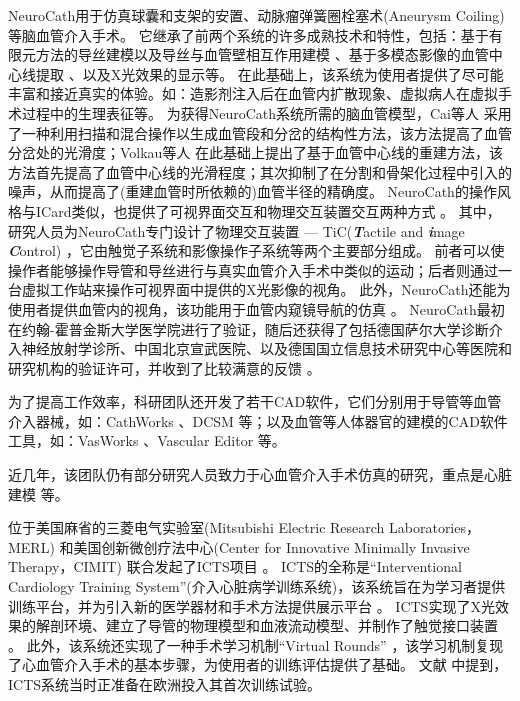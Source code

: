 NeuroCath用于仿真球囊和支架的安置、动脉瘤弹簧圈栓塞术(Aneurysm Coiling)等脑血管介入手术。
它继承了前两个系统的许多成熟技术和特性，包括：基于有限元方法的导丝建模以及导丝与血管壁相互作用建模 \cite{Wang1996daVinci,Chui1996daVinci}、基于多模态影像的血管中心线提取 \cite{Wang1998ICard}、以及X光效果的显示\cite{Wang1998aICard,Wang1998ICard}等。%
在此基础上，该系统为使用者提供了尽可能丰富和接近真实的体验。如：造影剂注入后在血管内扩散现象、虚拟病人在虚拟手术过程中的生理表征等。
为获得NeuroCath系统所需的脑血管模型，Cai等人 \cite{Ye2002Vessel,Cai2003aVessel,Cai2003Vessel}采用了一种利用扫描和混合操作以生成血管段和分岔的结构性方法，该方法提高了血管分岔处的光滑度；Volkau等人 \cite{Volkau2005Vessel,Volkau2008Vessel}在此基础上提出了基于血管中心线的重建方法，该方法首先提高了血管中心线的光滑程度；其次抑制了在分割和骨架化过程中引入的噪声，从而提高了(重建血管时所依赖的)血管半径的精确度。%
NeuroCath的操作风格与ICard类似，也提供了可视界面交互和物理交互装置交互两种方式 \cite{Nowinski2001NeuroCath}。
其中，研究人员为NeuroCath专门设计了物理交互装置 --- TiC(\textbf{\textit{T}}actile and \textbf{\textit{i}}mage \textbf{\textit{C}}ontrol)\cite{Chui1999TiC} \cite{Ma1999TiC}，它由触觉子系统和影像操作子系统等两个主要部分组成。%
前者可以使操作者能够操作导管和导丝进行与真实血管介入手术中类似的运动；后者则通过一台虚拟工作站来操作可视界面中提供的X光影像的视角。
此外，NeuroCath还能为使用者提供血管内的视角，该功能用于血管内窥镜导航的仿真 \cite{Nowinski2001NeuroCath}。
NeuroCath最初在约翰-霍普金斯大学医学院进行了验证，随后还获得了包括德国萨尔大学诊断介入神经放射学诊所、中国北京宣武医院、以及德国国立信息技术研究中心等医院和研究机构的验证许可，并收到了比较满意的反馈 \cite{Ma2007NeuroCath}。%

为了提高工作效率，科研团队还开发了若干CAD软件，它们分别用于导管等血管介入器械，如：CathWorks \cite{Cai1998CathWorks,Cai2000CathWorks}、DCSM \cite{Li2001DCSM}等；以及血管等人体器官的建模的CAD软件工具，如：VasWorks \cite{Cai2003Vessel}、Vascular Editor \cite{Ma2007NeuroCath}等。%

近几年，该团队仍有部分研究人员致力于心血管介入手术仿真的研究，重点是心脏建模 \cite{Chiang2011}\cite{Chiang2012}等。

位于美国麻省的三菱电气实验室(Mitsubishi Electric Research Laboratories，MERL) \cite{merlweb}和美国创新微创疗法中心(Center for Innovative Minimally Invasive Therapy，CIMIT) \cite{cimitweb}联合发起了ICTS项目 \cite{Dawson2000ICTS,Cotin2000ICTS,Shaffer1999ICTS}。%
ICTS的全称是“Interventional Cardiology Training System”(介入心脏病学训练系统)，该系统旨在为学习者提供训练平台，并为引入新的医学器材和手术方法提供展示平台 \cite{Cotin2000ICTS}。%
ICTS实现了X光效果的解剖环境、建立了导管的物理模型和血液流动模型、并制作了触觉接口装置 \cite{Cotin2000ICTS}。%
此外，该系统还实现了一种手术学习机制“Virtual Rounds” \cite{Shaffer1999ICTS}，该学习机制复现了心血管介入手术的基本步骤，为使用者的训练评估提供了基础。
文献 \cite{Dawson2000ICTS}中提到，ICTS系统当时正准备在欧洲投入其首次训练试验。

